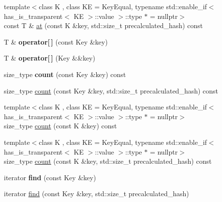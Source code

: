 \begin{DoxyCompactItemize}
\item 
{\footnotesize template$<$class K , class KE  = Key\+Equal, typename std\+::enable\+\_\+if$<$ has\+\_\+is\+\_\+transparent$<$ K\+E $>$\+::value $>$\+::type $\ast$  = nullptr$>$ }\\const T \& \mbox{\hyperlink{classtsl_1_1ordered__map_a94ca924689a733f0f2b2d958013c6ef9}{at}} (const K \&key, std\+::size\+\_\+t precalculated\+\_\+hash) const
\item 
\mbox{\label{classtsl_1_1ordered__map_abafea05d216c6cad6042815a9870104d}} 
T \& {\bfseries operator\mbox{[}$\,$\mbox{]}} (const Key \&key)
\item 
\mbox{\label{classtsl_1_1ordered__map_a7f9cc68fb60259cb3433df62f51c286a}} 
T \& {\bfseries operator\mbox{[}$\,$\mbox{]}} (Key \&\&key)
\item 
\mbox{\label{classtsl_1_1ordered__map_a245ef29c90f1803698d948b087f8fb6b}} 
size\+\_\+type {\bfseries count} (const Key \&key) const
\item 
size\+\_\+type \mbox{\hyperlink{classtsl_1_1ordered__map_a85c73fa60dbccb5f638892ee0b745566}{count}} (const Key \&key, std\+::size\+\_\+t precalculated\+\_\+hash) const
\item 
{\footnotesize template$<$class K , class KE  = Key\+Equal, typename std\+::enable\+\_\+if$<$ has\+\_\+is\+\_\+transparent$<$ K\+E $>$\+::value $>$\+::type $\ast$  = nullptr$>$ }\\size\+\_\+type \mbox{\hyperlink{classtsl_1_1ordered__map_a358979029b18f3000ad61fc329cdeab1}{count}} (const K \&key) const
\item 
{\footnotesize template$<$class K , class KE  = Key\+Equal, typename std\+::enable\+\_\+if$<$ has\+\_\+is\+\_\+transparent$<$ K\+E $>$\+::value $>$\+::type $\ast$  = nullptr$>$ }\\size\+\_\+type \mbox{\hyperlink{classtsl_1_1ordered__map_a7c474b66697735313d9da8f5b238f6da}{count}} (const K \&key, std\+::size\+\_\+t precalculated\+\_\+hash) const
\item 
\mbox{\label{classtsl_1_1ordered__map_a136482294dacdf7ffa5095feb88756a0}} 
iterator {\bfseries find} (const Key \&key)
\item 
iterator \mbox{\hyperlink{classtsl_1_1ordered__map_acf83c071d5e48bd5322ce39fcd2e2359}{find}} (const Key \&key, std\+::size\+\_\+t precalculated\+\_\+hash)

\end{DoxyCompactItemize}

